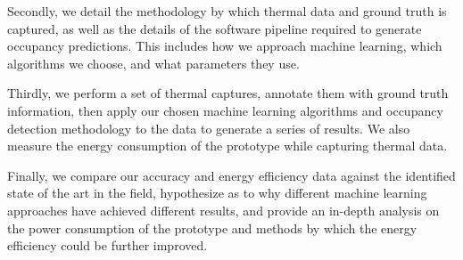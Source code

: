 \documentclass[../thesis/thesis.tex]{subfiles}
\begin{document}
\begin{enumerate}
Secondly, we detail the methodology by which thermal data and ground truth is captured, as well as the details of the software pipeline required to generate occupancy predictions. This includes how we approach machine learning, which algorithms we choose, and what parameters they use.

Thirdly, we perform a set of thermal captures, annotate them with ground truth information, then apply our chosen machine learning algorithms and occupancy detection methodology to the data to generate a series of results. We also measure the energy consumption of the prototype while capturing thermal data.

Finally, we compare our accuracy and energy efficiency data against the identified state of the art in the field, hypothesize as to why different machine learning approaches have achieved different results, and provide an in-depth analysis on the power consumption of the prototype and methods by which the energy efficiency could be further improved.
\end{enumerate}

\end{document}
